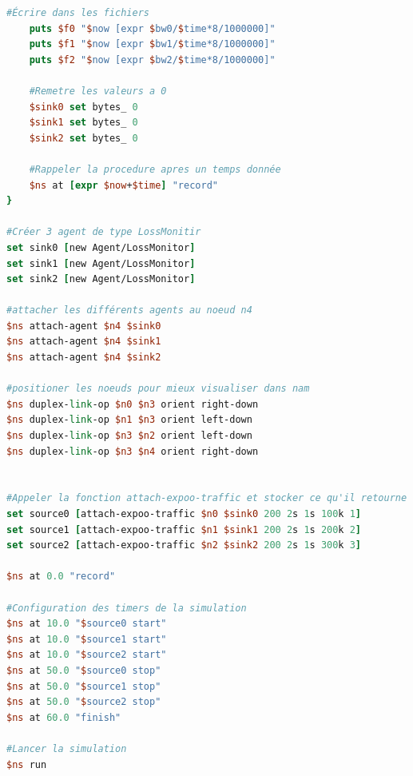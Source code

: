 \documentclass[11pt]{article}
\begin{document}
\begin{enumerate}
\begin{lstlisting}[language=tcl, label={tp3Exo1}, caption={TP3 - Script}]
	#Écrire dans les fichiers
	puts $f0 "$now [expr $bw0/$time*8/1000000]"
	puts $f1 "$now [expr $bw1/$time*8/1000000]"
	puts $f2 "$now [expr $bw2/$time*8/1000000]"
	
	#Remetre les valeurs a 0
	$sink0 set bytes_ 0
	$sink1 set bytes_ 0
	$sink2 set bytes_ 0
	
	#Rappeler la procedure apres un temps donnée
	$ns at [expr $now+$time] "record"
}

#Créer 3 agent de type LossMonitir
set sink0 [new Agent/LossMonitor]
set sink1 [new Agent/LossMonitor]
set sink2 [new Agent/LossMonitor]

#attacher les différents agents au noeud n4
$ns attach-agent $n4 $sink0
$ns attach-agent $n4 $sink1
$ns attach-agent $n4 $sink2

#positioner les noeuds pour mieux visualiser dans nam
$ns duplex-link-op $n0 $n3 orient right-down
$ns duplex-link-op $n1 $n3 orient left-down
$ns duplex-link-op $n3 $n2 orient left-down
$ns duplex-link-op $n3 $n4 orient right-down


#Appeler la fonction attach-expoo-traffic et stocker ce qu'il retourne
set source0 [attach-expoo-traffic $n0 $sink0 200 2s 1s 100k 1]
set source1 [attach-expoo-traffic $n1 $sink1 200 2s 1s 200k 2]
set source2 [attach-expoo-traffic $n2 $sink2 200 2s 1s 300k 3]

$ns at 0.0 "record"

#Configuration des timers de la simulation
$ns at 10.0 "$source0 start"
$ns at 10.0 "$source1 start"
$ns at 10.0 "$source2 start"
$ns at 50.0 "$source0 stop"
$ns at 50.0 "$source1 stop"
$ns at 50.0 "$source2 stop"
$ns at 60.0 "finish"

#Lancer la simulation
$ns run


\end{lstlisting}


\end{enumerate}
\end{document}
